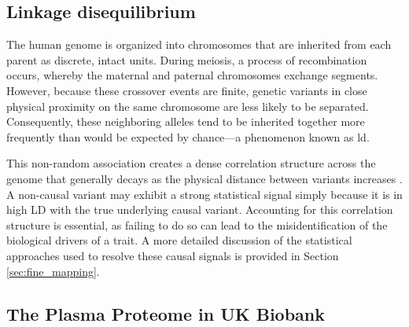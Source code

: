 
\subsection{Linkage disequilibrium}

The human genome is organized into chromosomes that are inherited from each parent as discrete, intact units. During meiosis, a process of recombination occurs, whereby the maternal and paternal chromosomes exchange segments. However, because these crossover events are finite, genetic variants in close physical proximity on the same chromosome are less likely to be separated. Consequently, these neighboring alleles tend to be inherited together more frequently than would be expected by chance---a phenomenon known as \gls{ld}.

This non-random association creates a dense correlation structure across the genome that generally decays as the physical distance between variants increases \cite{PRITCHARD20011}. A non-causal variant may exhibit a strong statistical signal simply because it is in high LD with the true underlying causal variant. Accounting for this correlation structure is essential, as failing to do so can lead to the misidentification of the biological drivers of a trait. A more detailed discussion of the statistical approaches used to resolve these causal signals is provided in Section \ref{sec:fine_mapping}.

\subsection{The Plasma Proteome in UK Biobank}

